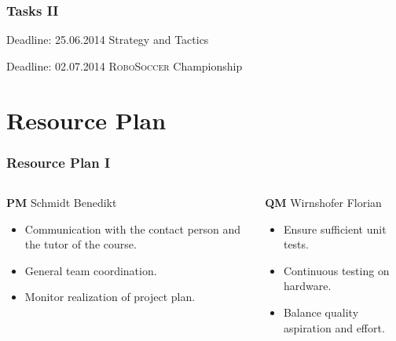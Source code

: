 \documentclass[hyperref={pdfpagelabels=false}]{beamer}
\begin{document}
\begin{frame}
	\frametitle{Tasks II} 
	\begin{block}{Deadline: 25.06.2014}
			Strategy and Tactics
	\end{block}
	\begin{block}{Deadline: 02.07.2014}
			\textsc{RoboSoccer} Championship
	\end{block}
\end{frame}

\section{Resource Plan} 
\begin{frame}
	\frametitle{Resource Plan I}
	\begin{columns}[t]
		\begin{column}{0.50\textwidth}
			\begin{block}{\textbf{PM} Schmidt Benedikt}
				\begin{itemize}
					\item Communication with the contact person and the tutor of the course.
					\item General team coordination.
					\item Monitor realization of project plan.
				\end{itemize}
			\end{block}
		\end{column}
		
		\begin{column}{0.50\textwidth}
			\begin{block}{\textbf{QM} Wirnshofer Florian}
				\begin{itemize}
					\item Ensure sufficient unit tests.
					\item Continuous testing on hardware.
					\item Balance quality aspiration and effort.
				\end{itemize}
			\end{block}
		\end{column}
	\end{columns}
\end{frame}
\end{document}

